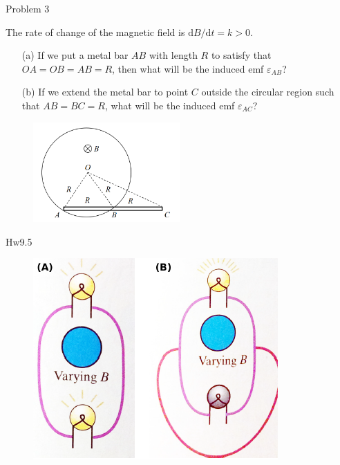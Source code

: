 \documentclass{beamer}
\begin{document}
\begin{frame}{Problem 3}

    The rate of change of the magnetic field is $\mathrm{d}B/\mathrm{d}t=k>0$. 
    \begin{itemize}
        \item[(a)] If we put a metal bar $AB$ with length $R$ to satisfy that $OA=OB=AB=R$, then what will be the induced emf $\varepsilon_{AB}$? 
        \item[(b)] If we extend the metal bar to point $C$ outside the circular region such that $AB=BC=R$, what will be the induced emf $\varepsilon_{AC}$?
    \end{itemize}
    
\begin{figure}[H]
 \centering
 \includegraphics[width=0.5\textwidth]{images/013.png}
\end{figure}
    
\end{frame}


\begin{frame}{Hw9.5}
    \begin{figure}[htbp]
        \centering
        \includegraphics[scale=0.8]{images/hw9_5.png}
    \end{figure}
\end{frame}
\end{document}
